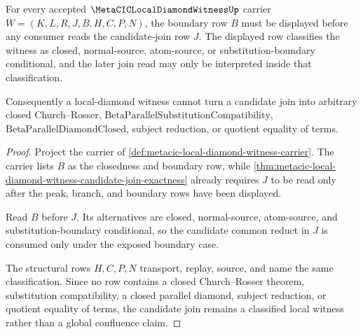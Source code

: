 \begin{theorem}
\label{thm:metacic-local-diamond-witness-closedness-boundary-classification}
For every accepted $\MetaCICLocalDiamondWitnessUp$ carrier $W=(K,L,R,J,B,H,C,P,N)$, the boundary row $B$ must be displayed before any consumer reads the candidate-join row $J$. The displayed row classifies the witness as closed, normal-source, atom-source, or substitution-boundary conditional, and the later join read may only be interpreted inside that classification.

Consequently a local-diamond witness cannot turn a candidate join into arbitrary closed Church--Rosser, $\mathrm{BetaParallelSubstitutionCompatibility}$, $\mathrm{BetaParallelDiamondClosed}$, subject reduction, or quotient equality of terms.
\end{theorem}
\begin{proof}
Project the carrier of \autoref{def:metacic-local-diamond-witness-carrier}. The carrier lists $B$ as the closedness and boundary row, while \autoref{thm:metacic-local-diamond-witness-candidate-join-exactness} already requires $J$ to be read only after the peak, branch, and boundary rows have been displayed.

Read $B$ before $J$. Its alternatives are closed, normal-source, atom-source, and substitution-boundary conditional, so the candidate common reduct in $J$ is consumed only under the exposed boundary case.

The structural rows $H,C,P,N$ transport, replay, source, and name the same classification. Since no row contains a closed Church--Rosser theorem, substitution compatibility, a closed parallel diamond, subject reduction, or quotient equality of terms, the candidate join remains a classified local witness rather than a global confluence claim.
\end{proof}


\begin{closurestatus}{\MetaCICLocalDiamondWitnessUp}
  \theoryclosure{\seedClosure}
  \formalstatus{\unformalizedV}
\end{closurestatus}
